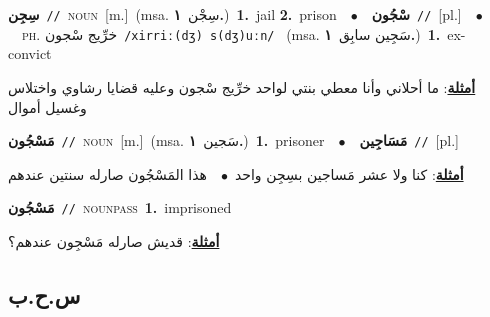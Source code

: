 \documentclass[10pt,a4paper,twoside]{article} %
\begin{document}
\begin{multicols}{2}
{\setlength\topsep{0pt}\textbf{\foreignlanguage{arabic}{سِجِن}}\ {\color{gray}\texttt{//}\color{black}}\ \textsc{noun}\ [m.]\ \color{gray}(msa. \foreignlanguage{arabic}{سِجْن}~\foreignlanguage{arabic}{\textbf{١.}})\color{black}\ \textbf{1.}~jail  \textbf{2.}~prison\ \ $\bullet$\ \ \setlength\topsep{0pt}\textbf{\foreignlanguage{arabic}{سْجُون}}\ {\color{gray}\texttt{//}\color{black}}\ [pl.]\ \ $\bullet$\ \ \textsc{ph.} \color{gray} \foreignlanguage{arabic}{خرِّيج سْجون}\color{black}\ {\color{gray}\texttt{/{\sffamily xirriː(dʒ) s(dʒ)uːn}/}\color{black}}\ \color{gray} (msa. \foreignlanguage{arabic}{سَجِين سابِق}~\foreignlanguage{arabic}{\textbf{١.}})\color{black}\ \textbf{1.}~ex-convict\  \begin{flushright}\color{gray}\foreignlanguage{arabic}{\textbf{\underline{\foreignlanguage{arabic}{أمثلة}}}: ما أحلاني وأنا معطي بنتي لواحد خرِّيج سْجون وعليه قضايا رشاوي واختلاس وغسيل أموال}\end{flushright}\color{black}} \vspace{2mm}

{\setlength\topsep{0pt}\textbf{\foreignlanguage{arabic}{مَسْجُون}}\ {\color{gray}\texttt{//}\color{black}}\ \textsc{noun}\ [m.]\ \color{gray}(msa. \foreignlanguage{arabic}{سَجين}~\foreignlanguage{arabic}{\textbf{١.}})\color{black}\ \textbf{1.}~prisoner\ \ $\bullet$\ \ \setlength\topsep{0pt}\textbf{\foreignlanguage{arabic}{مَسَاجِين}}\ {\color{gray}\texttt{//}\color{black}}\ [pl.]\  \begin{flushright}\color{gray}\foreignlanguage{arabic}{\textbf{\underline{\foreignlanguage{arabic}{أمثلة}}}: كنا ولا عشر مَساجين بسِجِن واحد\ $\bullet$\ \  هذا المَسْجُون صارله سنتين عندهم}\end{flushright}\color{black}} \vspace{2mm}

{\setlength\topsep{0pt}\textbf{\foreignlanguage{arabic}{مَسْجُون}}\ {\color{gray}\texttt{//}\color{black}}\ \textsc{noun\textunderscore pass}\ \textbf{1.}~imprisoned\  \begin{flushright}\color{gray}\foreignlanguage{arabic}{\textbf{\underline{\foreignlanguage{arabic}{أمثلة}}}: قديش صارله مَسْجِون عندهم؟}\end{flushright}\color{black}} \vspace{2mm}

\vspace{-3mm}
\subsection*{\color{blue}\foreignlanguage{arabic}{س.ح.ب}\color{blue}{}} 


\end{multicols}
\end{document}
